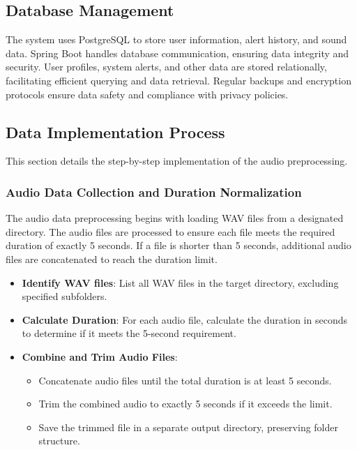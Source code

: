 \documentclass[conference]{IEEEtran}
\begin{document}
\subsection{Database Management}
The system uses PostgreSQL to store user information, alert history, and sound data. Spring Boot handles database communication, ensuring data integrity and security. User profiles, system alerts, and other data are stored relationally, facilitating efficient querying and data retrieval. Regular backups and encryption protocols ensure data safety and compliance with privacy policies.

\subsection{Data Implementation Process}
This section details the step-by-step implementation of the audio preprocessing.

\subsubsection{Audio Data Collection and Duration Normalization}
The audio data preprocessing begins with loading WAV files from a designated directory. The audio files are processed to ensure each file meets the required duration of exactly 5 seconds. If a file is shorter than 5 seconds, additional audio files are concatenated to reach the duration limit.

\begin{itemize}
    \item \textbf{Identify WAV files}: List all WAV files in the target directory, excluding specified subfolders.
    \item \textbf{Calculate Duration}: For each audio file, calculate the duration in seconds to determine if it meets the 5-second requirement.
    \item \textbf{Combine and Trim Audio Files}:
        \begin{itemize}
            \item Concatenate audio files until the total duration is at least 5 seconds.
            \item Trim the combined audio to exactly 5 seconds if it exceeds the limit.
            \item Save the trimmed file in a separate output directory, preserving folder structure.
        \end{itemize}
\end{itemize}
\end{document}
